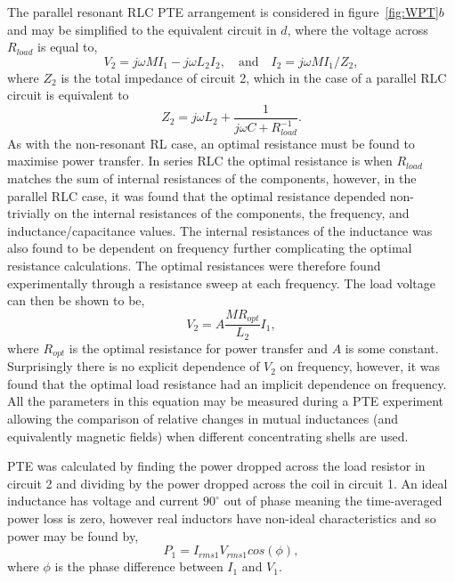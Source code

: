 \documentclass[11pt]{iopart}
\begin{document}
The parallel resonant RLC PTE arrangement is considered in
figure~\ref{fig:WPT}$b$ and may be simplified to the equivalent
circuit in $d$, where the voltage across $R_{load}$ is equal to,
\begin{equation}
 V_2 = j\omega MI_1 - j\omega L_2I_2,\quad\text{and}\quad
 I_2 = j\omega MI_1 / Z_2 ,
\end{equation}
where $Z_2$ is the total impedance of circuit 2, which in the case of
a parallel RLC circuit is equivalent to
\begin{equation}
  Z_2 = j\omega L_2 + \frac{1}{j\omega C + R_{load}^{-1}}.
\end{equation}
As with the non-resonant RL case, an optimal resistance must be found to maximise
power transfer. In series RLC the optimal resistance is when
$R_{load}$ matches the sum of internal resistances of the components,
however, in the parallel RLC case, it was found that the optimal
resistance depended non-trivially on the internal resistances of the
components, the frequency, and inductance/capacitance values. The
internal resistances of the inductance was also found to be dependent
on frequency further complicating the optimal resistance calculations.
The optimal resistances were therefore found experimentally through a
resistance sweep at each frequency.  The load voltage can then be
shown to be,
\begin{equation}
    V_2 = A \frac{MR_{opt}}{L_2}I_1,
\label{eqn:RLC-M}
\end{equation}
where $R_{opt}$ is the optimal resistance for power transfer and $A$ is
some constant. Surprisingly there is no explicit dependence of $V_2$ on
frequency, however, it was found that the optimal load resistance had
an implicit dependence on frequency. All the parameters in this
equation may be measured during a PTE experiment allowing the
comparison of relative changes in mutual inductances (and equivalently
magnetic fields) when different concentrating shells are used.

PTE was calculated by finding the power dropped across the load
resistor in circuit 2 and dividing by the power dropped across the
coil in circuit 1. An ideal inductance has voltage and current
$90^\circ$ out of phase meaning the time-averaged power loss is zero,
however real inductors have non-ideal characteristics and so power may
be found by,
\begin{equation}
    P_1 = I_{rms1}V_{rms1}cos(\phi),
\label{eqn:P1}
\end{equation}
where $\phi$ is the phase difference between $I_1$ and $V_1$.
\end{document}
